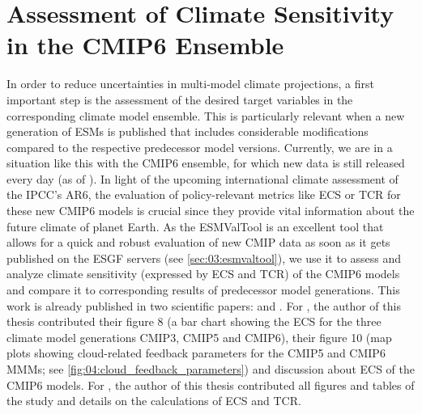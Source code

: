 


\chapter{Assessment of Climate Sensitivity in the \acs{CMIP}6 Ensemble}
\label{ch:04:papers_ecs_tcr_assessment}

In order to reduce uncertainties in multi-model climate projections, a first
important step is the assessment of the desired target variables in the
corresponding climate model ensemble. This is particularly relevant when a new
generation of \acp{ESM} is published that includes considerable modifications
compared to the respective predecessor model versions. Currently, we are in a
situation like this with the \acs{CMIP}6 ensemble, for which new data is still
released every day (as of \TheMonth{}). In light of the upcoming international
climate assessment of the \ac{IPCC}'s \acs{AR}6, the evaluation of
policy-relevant metrics like \ac{ECS} or \ac{TCR} for these new \acs{CMIP}6
models is crucial since they provide vital information about the future climate
of planet Earth. As the \ac{ESMValTool} is an excellent tool that allows for a
quick and robust evaluation of new \ac{CMIP} data as soon as it gets published
on the \ac{ESGF} servers (see \cref{sec:03:esmvaltool}), we use it to assess
and analyze climate sensitivity (expressed by \ac{ECS} and \ac{TCR}) of the
\acs{CMIP}6 models and compare it to corresponding results of predecessor model
generations. This work is already published in two scientific papers:
\textcite{Bock2020} and \textcite{Meehl2020}. For \textcite{Bock2020}, the
author of this thesis contributed their figure 8 (a bar chart showing the
\ac{ECS} for the three climate model generations \acs{CMIP}3, \acs{CMIP}5 and
\acs{CMIP}6), their figure 10 (map plots showing cloud-related feedback
parameters for the \acs{CMIP}5 and \acs{CMIP}6 \acp{MMM}; see
\cref{fig:04:cloud_feedback_parameters}) and discussion about \ac{ECS} of the
\acs{CMIP}6 models. For \textcite{Meehl2020}, the author of this thesis
contributed all figures and tables of the study and details on the calculations
of \ac{ECS} and \ac{TCR}.


